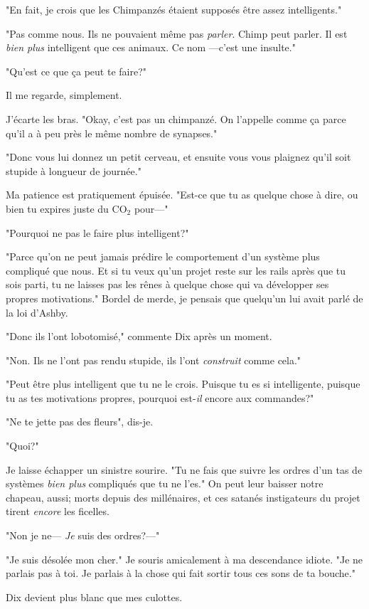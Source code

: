 "En fait, je crois que les Chimpanzés étaient supposés être assez intelligents."

"Pas comme nous. Ils ne pouvaient même pas \emph{parler}. Chimp peut parler. Il est \emph{bien plus} intelligent que ces animaux. Ce nom —c'est une insulte."

"Qu'est ce que ça peut te faire?"

Il me regarde, simplement.

J'écarte les bras. "Okay, c'est pas un chimpanzé. On l'appelle comme ça parce qu'il a à peu près le même nombre de synapses."

"Donc vous lui donnez un petit cerveau, et ensuite vous vous plaignez qu'il soit stupide à longueur de journée."

Ma patience est pratiquement épuisée. "Est-ce que tu as quelque chose à dire, ou bien tu expires juste du CO$_{2}$ pour—"

"Pourquoi ne pas le faire plus intelligent?"

"Parce qu'on ne peut jamais prédire le comportement d'un système plus compliqué que nous. Et si tu veux qu'un projet reste sur les rails après que tu sois parti, tu ne laisses pas les rênes à quelque chose qui va développer ses propres motivations." Bordel de merde, je pensais que quelqu'un lui avait parlé de la loi d'Ashby.

"Donc ils l'ont lobotomisé," commente Dix après un moment.

"Non. Ils ne l'ont pas rendu stupide, ils l'ont \emph{construit} comme cela."

"Peut être plus intelligent que tu ne le crois. Puisque tu es si intelligente, puisque tu as tes motivations propres, pourquoi est-\emph{il} encore aux commandes?"

"Ne te jette pas des fleurs", dis-je.

"Quoi?"

Je laisse échapper un sinistre sourire. "Tu ne fais que suivre les ordres d'un tas de systèmes \emph{bien plus} compliqués que tu ne l'es." On peut leur baisser notre chapeau, aussi; morts depuis des millénaires, et ces satanés instigateurs du projet tirent \emph{encore} les ficelles. 

"Non je ne— \emph{Je} suis des ordres?—"

"Je suis désolée mon cher." Je souris amicalement à ma descendance idiote. "Je ne parlais pas à toi. Je parlais à la chose qui fait sortir tous ces sons de ta bouche."

Dix devient plus blanc que mes culottes.

